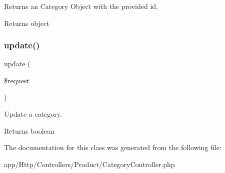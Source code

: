 Returns an Category Object with the provided id.

\begin{DoxyReturn}{Returns}
object 
\end{DoxyReturn}
\mbox{\label{class_app_1_1_http_1_1_controllers_1_1_product_1_1_category_controller_ab7b27a90191560dcef32126b0945db0d}} 
\subsubsection{\texorpdfstring{update()}{update()}}
{\footnotesize\ttfamily update (\begin{DoxyParamCaption}\item[{}]{\$request }\end{DoxyParamCaption})}

Update a category.

\begin{DoxyReturn}{Returns}
boolean 
\end{DoxyReturn}


The documentation for this class was generated from the following file\+:\begin{DoxyCompactItemize}
\item 
app/\+Http/\+Controllers/\+Product/Category\+Controller.\+php\end{DoxyCompactItemize}
